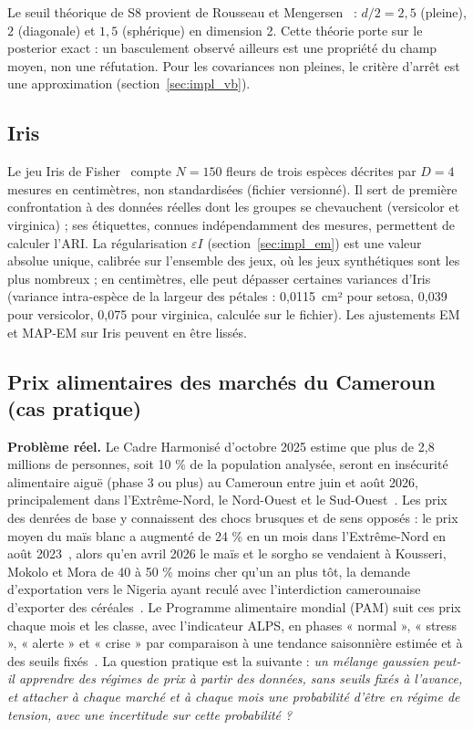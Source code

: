 Le seuil théorique de S8 provient de Rousseau et Mengersen~\cite{rousseau2011} : $d/2 = 2{,}5$ (pleine), $2$ (diagonale) et $1{,}5$ (sphérique) en dimension 2. Cette théorie porte sur le posterior exact : un basculement observé ailleurs est une propriété du champ moyen, non une réfutation. Pour les covariances non pleines, le critère d'arrêt est une approximation (section~\ref{sec:impl_vb}).

\subsection{Iris}\label{sec:iris_methodo}
Le jeu Iris de Fisher~\cite{fisher1936} compte $N=150$ fleurs de trois espèces décrites par $D=4$ mesures en centimètres, non standardisées (fichier versionné). Il sert de première confrontation à des données réelles dont les groupes se chevauchent (versicolor et virginica) ; ses étiquettes, connues indépendamment des mesures, permettent de calculer l'ARI. La régularisation $\varepsilon I$ (section~\ref{sec:impl_em}) est une valeur absolue unique, calibrée sur l'ensemble des jeux, où les jeux synthétiques sont les plus nombreux ; en centimètres, elle peut dépasser certaines variances d'Iris (variance intra-espèce de la largeur des pétales : 0,0115~cm² pour setosa, 0,039 pour versicolor, 0,075 pour virginica, calculée sur le fichier). Les ajustements EM et MAP-EM sur Iris peuvent en être lissés.

\subsection{Prix alimentaires des marchés du Cameroun (cas pratique)}\label{sec:prix_methodo}
\textbf{Problème réel. }Le Cadre Harmonisé d'octobre 2025 estime que plus de 2,8 millions de personnes, soit 10 \% de la population analysée, seront en insécurité alimentaire aiguë (phase 3 ou plus) au Cameroun entre juin et août 2026, principalement dans l'Extrême-Nord, le Nord-Ouest et le Sud-Ouest~\cite{giews2026,fewsnet2026}. Les prix des denrées de base y connaissent des chocs brusques et de sens opposés : le prix moyen du maïs blanc a augmenté de 24 \% en un mois dans l'Extrême-Nord en août 2023~\cite{pam2023bulletin}, alors qu'en avril 2026 le maïs et le sorgho se vendaient à Kousseri, Mokolo et Mora de 40 à 50 \% moins cher qu'un an plus tôt, la demande d'exportation vers le Nigeria ayant reculé avec l'interdiction camerounaise d'exporter des céréales~\cite{fewsnet2026}. Le Programme alimentaire mondial (PAM) suit ces prix chaque mois et les classe, avec l'indicateur ALPS, en phases « normal », « stress », « alerte » et « crise » par comparaison à une tendance saisonnière estimée et à des seuils fixés~\cite{pam2014alps}. La question pratique est la suivante : \emph{un mélange gaussien peut-il apprendre des régimes de prix à partir des données, sans seuils fixés à l'avance, et attacher à chaque marché et à chaque mois une probabilité d'être en régime de tension, avec une incertitude sur cette probabilité ?}

